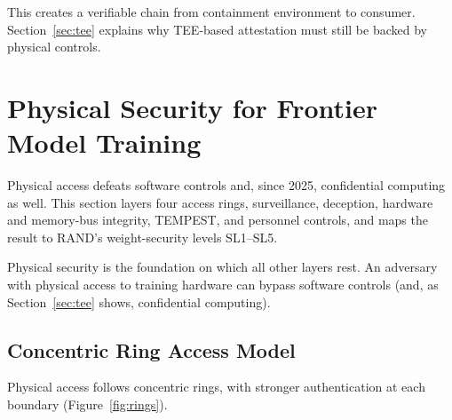 \documentclass[11pt,letterpaper]{article}
\begin{document}
This creates a verifiable chain from containment environment to consumer. Section~\ref{sec:tee} explains why TEE-based attestation must still be backed by physical controls.


\section{Physical Security for Frontier Model Training}
\label{sec:physical}

\begin{glance}
Physical access defeats software controls and, since 2025, confidential computing as well. This section layers four access rings, surveillance, deception, hardware and memory-bus integrity, TEMPEST, and personnel controls, and maps the result to RAND's weight-security levels SL1--SL5.
\end{glance}

Physical security is the foundation on which all other layers rest. An adversary with physical access to training hardware can bypass software controls (and, as Section~\ref{sec:tee} shows, confidential computing).

\subsection{Concentric Ring Access Model}

Physical access follows concentric rings, with stronger authentication at each boundary (Figure~\ref{fig:rings}).
\end{document}
